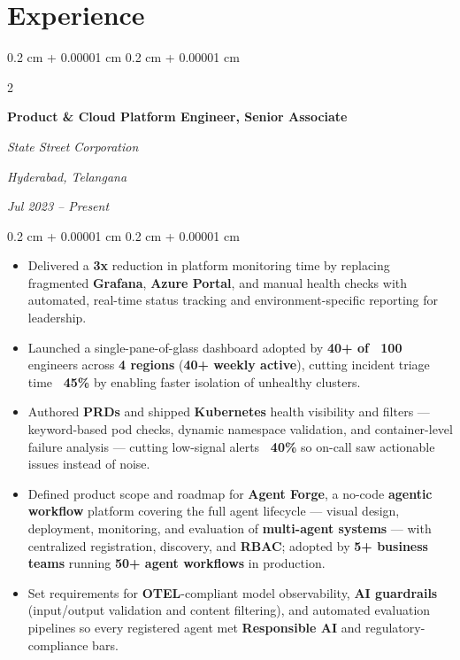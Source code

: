 \documentclass[10pt, letterpaper]{article}
\newenvironment{highlights}{
    \begin{itemize}[
        topsep=0.10 cm,
        parsep=0.10 cm,
        partopsep=0pt,
        itemsep=0pt,
        leftmargin=0.4 cm + 10pt
    ]
}{
    \end{itemize}
} %
\newenvironment{onecolentry}{
    \begin{adjustwidth}{
        0.2 cm + 0.00001 cm
    }{
        0.2 cm + 0.00001 cm
    }
}{
    \end{adjustwidth}
} %
\newenvironment{twocolentry}[2][]{
    \onecolentry
    \def\secondColumn{#2}
    \setcolumnwidth{\fill, 4.5 cm}
    \begin{paracol}{2}
}{
    \switchcolumn \raggedleft \secondColumn
    \end{paracol}
    \endonecolentry
} %
\begin{document}
    \section{Experience}

        \begin{twocolentry}{
        \textit{Hyderabad, Telangana}    
            
        \textit{Jul 2023 – Present}}
            \textbf{Product \& Cloud Platform Engineer, Senior Associate}
            
            \textit{State Street Corporation}
        \end{twocolentry}

        \vspace{0.10 cm}
        \begin{onecolentry}
            \begin{highlights}
                \item Delivered a \textbf{3x} reduction in platform monitoring time by replacing fragmented \textbf{Grafana}, \textbf{Azure Portal}, and manual health checks with automated, real-time status tracking and environment-specific reporting for leadership.

                \item Launched a single-pane-of-glass dashboard adopted by \textbf{40+ of ~100} engineers across \textbf{4 regions} (\textbf{40+ weekly active}), cutting incident triage time \textbf{~45\%} by enabling faster isolation of unhealthy clusters.

                \item Authored \textbf{PRDs} and shipped \textbf{Kubernetes} health visibility and filters — keyword-based pod checks, dynamic namespace validation, and container-level failure analysis — cutting low-signal alerts \textbf{~40\%} so on-call saw actionable issues instead of noise.

                \item Defined product scope and roadmap for \textbf{Agent Forge}, a no-code \textbf{agentic workflow} platform covering the full agent lifecycle --- visual design, deployment, monitoring, and evaluation of \textbf{multi-agent systems} --- with centralized registration, discovery, and \textbf{RBAC}; adopted by \textbf{5+ business teams} running \textbf{50+ agent workflows} in production.

                \item Set requirements for \textbf{OTEL}-compliant model observability, \textbf{AI guardrails} (input/output validation and content filtering), and automated evaluation pipelines so every registered agent met \textbf{Responsible AI} and regulatory-compliance bars.


\end{highlights}
\end{onecolentry}
\end{document}
